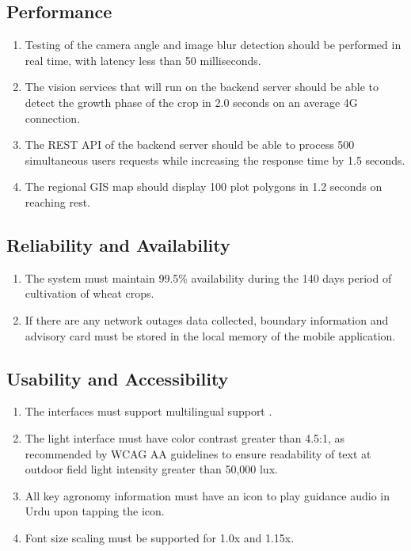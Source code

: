 \documentclass{FastFyp}
\begin{document}
\subsection{Performance}
\begin{enumerate}
    \item Testing of the camera angle and image blur detection should be performed in real time, with latency less than 50 milliseconds.
    \item The vision services that will run on the backend server should be able to detect the growth phase of the crop in 2.0 seconds on an average 4G connection.
    \item The REST API of the backend server should be able to process 500 simultaneous users requests while increasing the response time by 1.5 seconds.
    \item The regional GIS map should display 100 plot polygons in 1.2 seconds on reaching rest.
\end{enumerate}

\subsection{Reliability and Availability}
\begin{enumerate}
    \item The system must maintain 99.5\% availability during the 140 days period of cultivation of wheat crops.
    \item If there are any network outages data collected, boundary information and advisory card must be stored in the local memory of the mobile application.
\end{enumerate}
\subsection{Usability and Accessibility}

\begin{enumerate}
    \item The interfaces must support multilingual support .
    \item The light interface must have color contrast greater than 4.5:1, as recommended by WCAG AA guidelines to ensure readability of text at outdoor field light intensity greater than 50,000 lux.
    \item All key agronomy information must have an icon to play guidance audio in Urdu upon tapping the icon.
    \item Font size scaling must be supported for 1.0x and 1.15x.
\end{enumerate}
\end{document}
